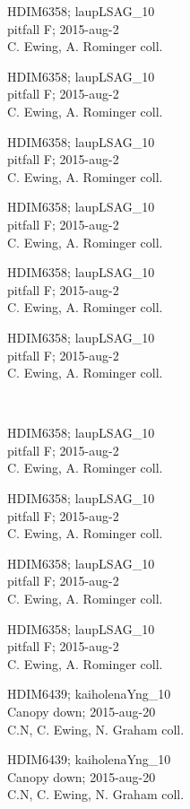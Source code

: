 \documentclass[2pt]{extarticle}
\begin{document}
\noindent
\raggedright
\parbox{0.16\textwidth}{\tiny \raggedright \rule[-0.3\baselineskip]{0pt}{10pt}HDIM6358; laupLSAG\_10\\ pitfall F; 2015-aug-2\\ C. Ewing, A. Rominger coll.}
\parbox{0.16\textwidth}{\tiny \raggedright \rule[-0.3\baselineskip]{0pt}{10pt}HDIM6358; laupLSAG\_10\\ pitfall F; 2015-aug-2\\ C. Ewing, A. Rominger coll.}
\parbox{0.16\textwidth}{\tiny \raggedright \rule[-0.3\baselineskip]{0pt}{10pt}HDIM6358; laupLSAG\_10\\ pitfall F; 2015-aug-2\\ C. Ewing, A. Rominger coll.}
\parbox{0.16\textwidth}{\tiny \raggedright \rule[-0.3\baselineskip]{0pt}{10pt}HDIM6358; laupLSAG\_10\\ pitfall F; 2015-aug-2\\ C. Ewing, A. Rominger coll.}
\parbox{0.16\textwidth}{\tiny \raggedright \rule[-0.3\baselineskip]{0pt}{10pt}HDIM6358; laupLSAG\_10\\ pitfall F; 2015-aug-2\\ C. Ewing, A. Rominger coll.}
\parbox{0.16\textwidth}{\tiny \raggedright \rule[-0.3\baselineskip]{0pt}{10pt}HDIM6358; laupLSAG\_10\\ pitfall F; 2015-aug-2\\ C. Ewing, A. Rominger coll.} \\ 
\vspace{0.001in} 

\noindent
\parbox{0.16\textwidth}{\tiny \raggedright \rule[-0.3\baselineskip]{0pt}{10pt}HDIM6358; laupLSAG\_10\\ pitfall F; 2015-aug-2\\ C. Ewing, A. Rominger coll.}
\parbox{0.16\textwidth}{\tiny \raggedright \rule[-0.3\baselineskip]{0pt}{10pt}HDIM6358; laupLSAG\_10\\ pitfall F; 2015-aug-2\\ C. Ewing, A. Rominger coll.}
\parbox{0.16\textwidth}{\tiny \raggedright \rule[-0.3\baselineskip]{0pt}{10pt}HDIM6358; laupLSAG\_10\\ pitfall F; 2015-aug-2\\ C. Ewing, A. Rominger coll.}
\parbox{0.16\textwidth}{\tiny \raggedright \rule[-0.3\baselineskip]{0pt}{10pt}HDIM6358; laupLSAG\_10\\ pitfall F; 2015-aug-2\\ C. Ewing, A. Rominger coll.}
\parbox{0.16\textwidth}{\tiny \raggedright \rule[-0.3\baselineskip]{0pt}{10pt}HDIM6439; kaiholenaYng\_10\\ Canopy down; 2015-aug-20\\ C.N, C. Ewing, N. Graham coll.}
\parbox{0.16\textwidth}{\tiny \raggedright \rule[-0.3\baselineskip]{0pt}{10pt}HDIM6439; kaiholenaYng\_10\\ Canopy down; 2015-aug-20\\ C.N, C. Ewing, N. Graham coll.} \\ 
\vspace{0.001in} 
\end{document}
